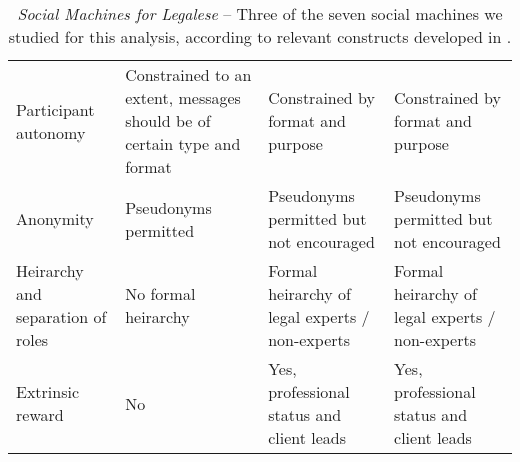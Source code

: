 \documentclass{sig-alternate}
\begin{document}
\begin{table}[htp]
\begin{tabular}{|p{3.5cm}|p{4cm}|p{4cm}|p{4cm}|}
    Participant autonomy              & Constrained to an extent, messages should be of certain type and format                                                                                                 & Constrained by format and purpose                                                                        & Constrained by format and purpose                                                   \\
    Anonymity                         & Pseudonyms permitted                                                                                                                                                     & Pseudonyms permitted but not encouraged                                                                  & Pseudonyms permitted but not encouraged                                             \\
    Heirarchy and separation of roles & No formal heirarchy                                                                                                                                                      & Formal heirarchy of legal experts / non-experts                                                          & Formal heirarchy of legal experts / non-experts                                     \\
    Extrinsic reward                  & No                                                                                                                                                                       & Yes, professional status and client leads                                                               & Yes, professional status and client leads                                          \\ \hline
    \end{tabular}
\caption{\emph{Social Machines for Legalese} -- Three of the seven social
  machines we studied for this analysis, according to relevant constructs developed in \cite{shadbolt:classif}.} \label{table:constructs}
\end{table}



\balancecolumns %
\end{document}

